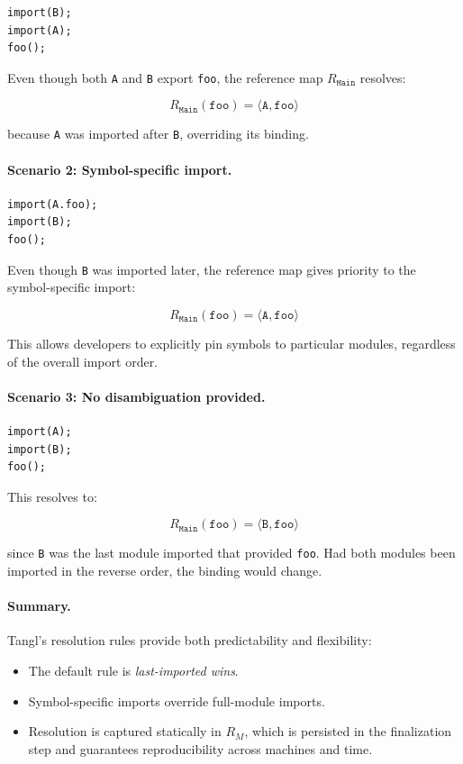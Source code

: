 \documentclass[sigplan,screen]{acmart}
\begin{document}
\begin{verbatim}
import(B);
import(A);
foo();
\end{verbatim}

Even though both \texttt{A} and \texttt{B} export \texttt{foo}, the reference map $R_{\texttt{Main}}$ resolves:

\[
R_{\texttt{Main}}(\texttt{foo}) = \langle \texttt{A}, \texttt{foo} \rangle
\]

because \texttt{A} was imported after \texttt{B}, overriding its binding.

\paragraph{Scenario 2: Symbol-specific import.}

\begin{verbatim}
import(A.foo);
import(B);
foo();
\end{verbatim}

Even though \texttt{B} was imported later, the reference map gives priority to the symbol-specific import:

\[
R_{\texttt{Main}}(\texttt{foo}) = \langle \texttt{A}, \texttt{foo} \rangle
\]

This allows developers to explicitly pin symbols to particular modules, regardless of the overall import order.

\paragraph{Scenario 3: No disambiguation provided.}

\begin{verbatim}
import(A);
import(B);
foo();
\end{verbatim}

This resolves to:

\[
R_{\texttt{Main}}(\texttt{foo}) = \langle \texttt{B}, \texttt{foo} \rangle
\]

since \texttt{B} was the last module imported that provided \texttt{foo}. Had both modules been imported in the reverse order, the binding would change.

\paragraph{Summary.}

Tangl's resolution rules provide both predictability and flexibility:

\begin{itemize}
    \item The default rule is \textit{last-imported wins}.
    \item Symbol-specific imports override full-module imports.
    \item Resolution is captured statically in $R_M$, which is persisted in the finalization step and guarantees reproducibility across machines and time.
\end{itemize}
\end{document}
